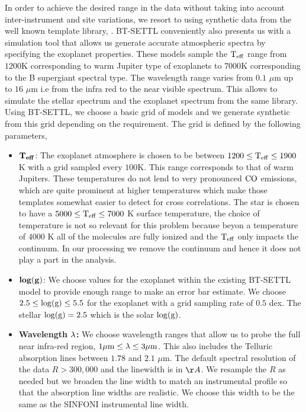 In order to achieve the desired range in the data without taking into account inter-instrument and site variations, we resort to using synthetic data from the well known template library, \citep[\textsc{BT-SETTL},][]{1997Allard,2011Allard}.
\textsc{BT-SETTL} conveniently also presents us with a simulation tool \citep[\textsc{PHOENIX},][]{2011Allard} that allows us generate accurate atmospheric spectra by specifying the exoplanet properties.
These models sample the $\rm{T_{eff}}$ range from $1200$K corresponding to warm Jupiter type of exoplanets to $7000$K corresponding to the B supergiant spectral type.
The wavelength range varies from $0.1$ $\mu$m up to $16$ $\mu$m i.e from the infra red to the near visible spectrum. 
This allows to simulate the stellar spectrum and the exoplanet spectrum from the same library.
Using BT-SETTL, we choose a basic grid of models and we generate synthetic from this grid depending on the requirement.
The grid is defined by the following parameters,
\begin{itemize}
    \item[] $\rm{\mathbf{T_{eff}}}$: The exoplanet atmosphere is chosen to be between $1200\le \rm{T_{eff}}\le 1900$ K with a grid sampled every $100$K. 
    This range corresponds to that of warm Jupiters. 
    These temperatures do not lend to very pronounced $\rm{CO}$ emissions, which are quite prominent at higher temperatures which make those templates somewhat easier to detect for cross correlations. 
    The star is chosen to have a $5000\le \rm{T_{eff}}\le 7000$ K surface temperature, the choice of temperature is not so relevant for this problem because beyon a temperature of $4000$ K all of the molecules are fully ionized and the $\rm{T_{eff}}$ only impacts the continuum. 
    In our processing we remove the continuum and hence it does not play a part in the analysis.
    \item []$\rm{\mathbf{log(g)}}$: We choose values for the exoplanet within the existing BT-SETTL model to provide enough range to make an error bar estimate. 
    We choose $2.5\le \rm{\log(g)} \le 5.5$ for the exoplanet with a grid sampling rate of $0.5$ dex. 
    The stellar $\rm{\log(g)} = 2.5$ which is the solar $\rm{\log(g)}$.
    \item []\textbf{Wavelength $\rm{\mathbf{\lambda}}$:} We choose wavelength ranges that allow us to probe the full near infra-red region, $1 \mu\rm{m} \le \lambda \le 3 \mu \rm{m}$.
    This also includes the Telluric absorption lines between $1.78$ and $2.1$ $\mu$m.
    The default spectral resolution of the data $R>300,000$ and the linewidth is in $\AA$. 
    We resample the $R$ as needed but we broaden the line width to match an instrumental profile so that the absorption line widths are realistic.
    We choose this width to be the same as the SINFONI instrumental line width.
\end{itemize}

